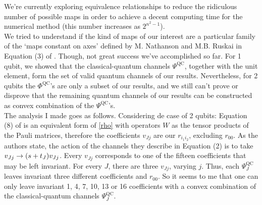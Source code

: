 \documentclass[11pt]{article}
\begin{document}
We're currently exploring equivalence relationships to reduce the ridiculous number of possible maps in order to achieve a decent computing time for the numerical method (this number increases as $2^{n^2-1}$). \\ 

We tried to understand if the kind of maps of our interest are a particular family of the `maps constant on axes' defined by M. Nathanson and M.B. Ruskai in Equation (3) of \cite{nathanson2007pauli}. Though, not great success we've accomplished so far. For 1 qubit, we showed that the classical-quantum channels $\Psi ^{\text{QC}}$, together with the unit element, form the set of valid quantum channels of our results. Nevertheless, for 2 qubits the $\Phi ^{\text{QC}}$'s are only a subset of our results, and we still can't prove or disprove that the remaining quantum channels of our results can be constructed as convex combination of the $\Psi ^{\text{QC}}$'s.\\

The analysis I made goes as follows. Considering de case of 2 qubits: Equation (8) of \cite{nathanson2007pauli} is an equivalent form of \eqref{rho} with operators $W$ as the tensor products of the Pauli matrices, therefore the coefficients $v_{Jj}$ are our $r_{i_1i_2}$, excluding $r_{00}$. As the authors state, the action of the channels they describe in Equation (2) is to take $v_{Jj}\to \qty(s+t_J)v_{Jj}$. Every $v_{Jj}$ corresponds to one of the fifteen coefficients that may be left invariant. For every $J$, there are three $v_{Jj}$, varying $j$. Thus, each $\Psi ^{\text{QC}}_J$ leaves invariant three different coefficients and $r_{00}$. So it seems to me that one can only leave invariant 1, 4, 7, 10, 13 or 16 coefficients with a convex combination of the classical-quantum channels $\Psi ^{\text{QC}}_J$.



\end{document}

